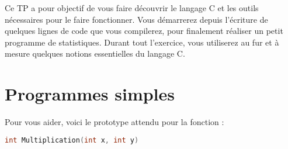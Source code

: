 \documentclass[11pt,a4paper]{article}
\begin{document}
\EncadreTitre

\bigskip


%
%

\bigskip


Ce TP a pour objectif de vous faire découvrir le langage C et les outils nécessaires pour le faire fonctionner.
Vous démarrerez depuis l'écriture de quelques lignes de code que vous compilerez, pour finalement réaliser un petit programme de statistiques.
Durant tout l'exercice, vous utiliserez au fur et à mesure quelques notions essentielles du langage C.

\bigskip

\section{Programmes simples}

\medskip


Pour vous aider, voici le prototype attendu pour la fonction :

\begin{lstlisting}[language=C,morekeywords={floor,ceil}]
int Multiplication(int x, int y) \end{lstlisting}


\end{document}
